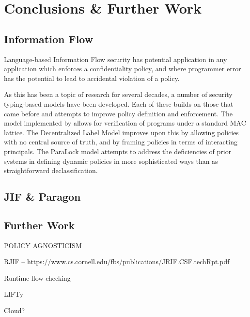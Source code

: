 \chapter{Conclusions \& Further Work}

\section{Information Flow}

Language-based Information Flow security has potential application in any application which enforces a confidentiality policy, and where programmer error has the potential to lead to accidental violation of a policy.

As this has been a topic of research for several decades, a number of security typing-based models have been developed. Each of these builds on those that came before and attempts to improve policy definition and enforcement. The model implemented by \citeauthor{denning1977certification} \cite{denning1977certification} allows for verification of programs under a standard MAC lattice. The Decentralized Label Model improves upon this by allowing policies with no central source of truth, and by framing policies in terms of interacting principals. The ParaLock model attempts to address the deficiencies of prior systems in defining dynamic policies in more sophisticated ways than as straightforward declassification.

\section{JIF \& Paragon}

\section{Further Work}

POLICY AGNOSTICISM

RJIF -- https://www.cs.cornell.edu/fbs/publications/JRIF.CSF.techRpt.pdf

Runtime flow checking

LIFTy \cite{polikarpova2016lifty}

Cloud?